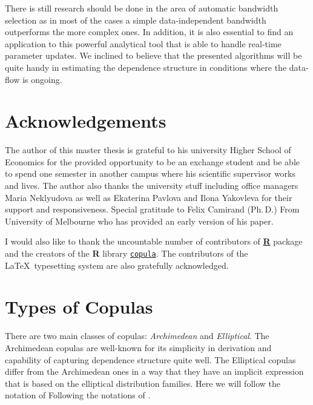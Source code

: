 \documentclass[12pt]{article}
\begin{document}
	There is still research should be done in the area of automatic bandwidth selection as in most of the cases a simple data-independent bandwidth outperforms the more complex ones. In addition, it is also essential to find an application to this powerful analytical tool that is able to handle real-time parameter updates. We inclined to believe that the presented algorithms will be quite handy in estimating the dependence structure in conditions where the data-flow is ongoing.
	
	\section*{Acknowledgements}
	
	The author of this master thesis is grateful to his university Higher School of Economics for the provided opportunity to be an exchange student and be able to spend one semester in another campus where his scientific supervisor works and lives. The author also thanks the university stuff including office managers Maria Neklyudova as well as Ekaterina Pavlova and Ilona Yakovleva for their support and responsiveness. Special gratitude to Felix Camirand (Ph.\,D.) From University of Melbourne who has provided an early version of his paper.
	
	I would also like to thank the uncountable number of contributors of \href{https://R-project.org/}{\textbf{R}} package and the creators of the \textbf{R} library \href{https://cran.r-project.org/web/packages/copula/copula.pdf}{\texttt{copula}}. The contributors of the \LaTeX~typesetting system are also gratefully acknowledged. 
	
	\nocite{R} \nocite{Rcopula1} \nocite{Rcopula2} \nocite{Rcopula3} \nocite{Rcopula4}
	
	\printbibliography
	\pagebreak
	\appendix
	\section{Types of Copulas}\label{sec:copula_types}
	
	There are two main classes of copulas: \textit{Archimedean} and \textit{Elliptical}. The Archimedean copulas are well-known for its simplicity in derivation and capability of capturing dependence structure quite well. The Elliptical copulas differ from the Archimedean ones in a way that they have an implicit expression that is based on the elliptical distribution families. Here we will follow the notation of Following the notations of \textcite{Hyrs2015}.
	
\end{document}
